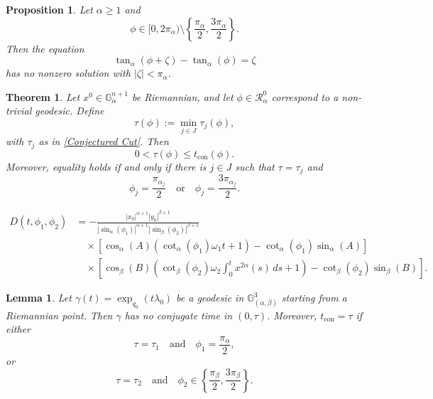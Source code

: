 \documentclass[10pt,a4paper]{amsart}
\newtheorem{proposition}{Proposition}
\newtheorem{theorem}{Theorem}
\newtheorem{lemma}{Lemma}
\begin{document}
\begin{proposition}\label{tan function solution}
    Let \(\alpha\geq1\) and
    \[
        \phi\in[0,2\pi_\alpha)
        \setminus
        \left\{
        \frac{\pi_\alpha}{2},
        \frac{3\pi_\alpha}{2}
        \right\}.
    \]
    Then the equation
    \begin{equation}\label{tan equation}
        \tan_\alpha(\phi+\zeta)-\tan_\alpha(\phi)=\zeta
    \end{equation}
    has no nonzero solution with \(|\zeta|<\pi_\alpha\).
\end{proposition}

\begin{theorem}\label{Determinant}
    Let \(x^0\in\mathbb G_\alpha^{n+1}\) be Riemannian, and let
    \(\phi\in\mathcal R_\alpha^0\) correspond to a non-trivial geodesic. Define
    \[
        \tau(\phi):=\min_{j\in J}\tau_j(\phi),
    \]
    with \(\tau_j\) as in \eqref{Conjectured Cut}. Then
    \begin{equation}\label{conjugate inequality}
        0<\tau(\phi)\leq t_{\operatorname{con}}(\phi).
    \end{equation}
    Moreover, equality holds if and only if there is \(j\in J\) such that
    \(\tau=\tau_j\) and
    \[
        \phi_j=\frac{\pi_{\alpha_j}}{2}
        \quad\text{or}\quad
        \phi_j=\frac{3\pi_{\alpha_j}}{2}.
    \]
\end{theorem}

\begin{equation}\label{det formula 3D}
    \begin{aligned}
        D(t,\phi_1,\phi_2)
         & =
        -
        \frac{|x_0|^{\alpha+1}|y_0|^{\beta+1}}
        {|\sin_\alpha(\phi_1)|^{\alpha+1}|\sin_\beta(\phi_2)|^{\beta+1}}
        \\
         & \quad\times
        \left[
            \cos_\alpha(A)
            \left(\cot_\alpha(\phi_1)\omega_1t+1\right)
            -
            \cot_\alpha(\phi_1)\sin_\alpha(A)
            \right]
        \\
         & \quad\times
        \left[
            \cos_\beta(B)
            \left(
            \cot_\beta(\phi_2)\omega_2
            \int_0^t x^{2\alpha}(s)\,ds
            +1
            \right)
            -
            \cot_\beta(\phi_2)\sin_\beta(B)
            \right].
    \end{aligned}
\end{equation}

\begin{lemma}\label{Con Times 3D}
    Let \(\gamma(t)=\exp_{q_0}(t\lambda_0)\) be a geodesic in
    \(\mathbb G^3_{(\alpha,\beta)}\) starting from a Riemannian point. Then \(\gamma\) has no
    conjugate time in \((0,\tau)\). Moreover, \(t_{\operatorname{con}}=\tau\) if either
    \[
        \tau=\tau_1
        \quad\text{and}\quad
        \phi_1=\frac{\pi_\alpha}{2},
    \]
    or
    \[
        \tau=\tau_2
        \quad\text{and}\quad
        \phi_2\in
        \left\{
        \frac{\pi_\beta}{2},
        \frac{3\pi_\beta}{2}
        \right\}.
    \]
\end{lemma}
\end{document}
